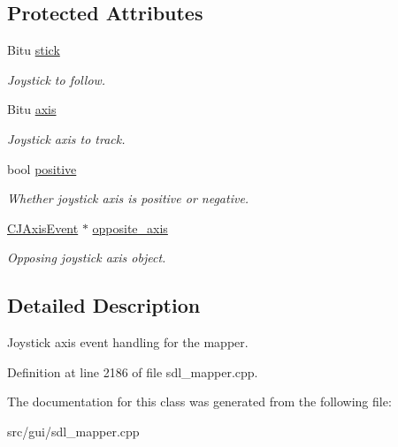 \subsection*{Protected Attributes}
\begin{DoxyCompactItemize}
\item 
\hypertarget{classCJAxisEvent_a4445db17f0538358d815ab53d449beba}{Bitu \hyperlink{classCJAxisEvent_a4445db17f0538358d815ab53d449beba}{stick}}\label{classCJAxisEvent_a4445db17f0538358d815ab53d449beba}

\begin{DoxyCompactList}\small\item\em Joystick to follow. \end{DoxyCompactList}\item 
\hypertarget{classCJAxisEvent_aef7080ddb8c0a07235865f4f8f33bf90}{Bitu \hyperlink{classCJAxisEvent_aef7080ddb8c0a07235865f4f8f33bf90}{axis}}\label{classCJAxisEvent_aef7080ddb8c0a07235865f4f8f33bf90}

\begin{DoxyCompactList}\small\item\em Joystick axis to track. \end{DoxyCompactList}\item 
\hypertarget{classCJAxisEvent_a90367a0731415ea7dd7b3d01fa153367}{bool \hyperlink{classCJAxisEvent_a90367a0731415ea7dd7b3d01fa153367}{positive}}\label{classCJAxisEvent_a90367a0731415ea7dd7b3d01fa153367}

\begin{DoxyCompactList}\small\item\em Whether joystick axis is positive or negative. \end{DoxyCompactList}\item 
\hypertarget{classCJAxisEvent_aef506ec736efabf7a118af104921a998}{\hyperlink{classCJAxisEvent}{C\-J\-Axis\-Event} $\ast$ \hyperlink{classCJAxisEvent_aef506ec736efabf7a118af104921a998}{opposite\-\_\-axis}}\label{classCJAxisEvent_aef506ec736efabf7a118af104921a998}

\begin{DoxyCompactList}\small\item\em Opposing joystick axis object. \end{DoxyCompactList}\end{DoxyCompactItemize}


\subsection{Detailed Description}
Joystick axis event handling for the mapper. 

Definition at line 2186 of file sdl\-\_\-mapper.\-cpp.



The documentation for this class was generated from the following file\-:\begin{DoxyCompactItemize}
\item 
src/gui/sdl\-\_\-mapper.\-cpp\end{DoxyCompactItemize}
